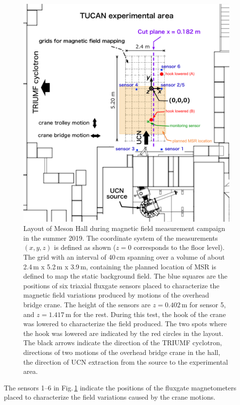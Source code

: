 \begin{figure}[htb!]
     \centering
     \includegraphics[width=.9\textwidth]{graphics/AMC/Layout_CDR.pdf}
     \caption{Layout of Meson Hall during magnetic field measurement campaign in the summer 2019. The coordinate system of the measurements $(x,y,z)$ is defined as shown ($z=0$ corresponds to the floor level).
     The grid with an interval of 40\,cm spanning over a volume of about 2.4\,m x 5.2\,m x 3.9\,m, containing the planned location of MSR is defined to map the static background field. The blue squares are the positions of six triaxial fluxgate sensors placed to characterize the magnetic field variations produced by motions of the overhead bridge crane. The height of the sensors are $z=0.402$\,m for sensor 5, and $z=1.417$\,m for the rest. During this test, the hook of the crane was lowered to characterize the field produced. The two spots where the hook was lowered are indicated by the red circles in the layout.
     The black arrows indicate the direction of the TRIUMF cyclotron, directions of  two motions of the overhead bridge crane in the hall, the direction of UCN extraction from the source to the experimental area.  }
     \label{fig:amc_layout}
 \end{figure}
 The sensors 1--6 in Fig.\,\ref{fig:amc_layout} indicate the positions of the fluxgate magnetometers placed to characterize the field variations caused by the crane motions. 
